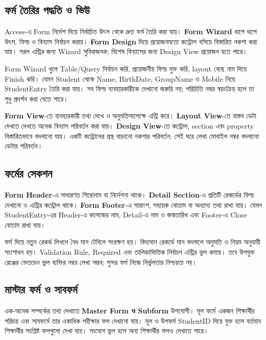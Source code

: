 \subsection{ফর্ম তৈরির পদ্ধতি ও ভিউ}
Access-এ Form নির্দেশ দিয়ে নির্বাচিত উৎস থেকে দ্রুত ফর্ম তৈরি করা যায়। \textbf{Form Wizard} ধাপে ধাপে উৎস, ফিল্ড ও বিন্যাস নির্বাচন করায়। \textbf{Form Design} দিয়ে প্রয়োজনমতো কন্ট্রোল বসিয়ে বিস্তারিত নকশা করা যায়। সরল এন্ট্রির জন্য Wizard সুবিধাজনক; বিশেষ বিন্যাসের জন্য Design View প্রয়োজন হতে পারে।

Form Wizard খুলে Table/Query নির্বাচন করি, প্রয়োজনীয় ফিল্ড যুক্ত করি, layout বেছে নাম দিয়ে Finish করি। যেমন Student থেকে Name, BirthDate, GroupName ও Mobile নিয়ে StudentEntry তৈরি করা যায়। সব ফিল্ড ব্যবহারকারীকে দেখানো জরুরি নয়; পরিচিতি নম্বর স্বয়ংক্রিয় হলে তা শুধু প্রদর্শন করা যেতে পারে।

\textbf{Form View}-তে ব্যবহারকারী তথ্য দেখে ও অনুমতিসাপেক্ষে এন্ট্রি করে। \textbf{Layout View}-তে বাস্তব ডেটা দেখতে দেখতে অনেক বিন্যাস পরিবর্তন করা যায়। \textbf{Design View}-তে কন্ট্রোল, section এবং property বিস্তারিতভাবে বদলানো যায়। একটি কন্ট্রোলের প্রস্থ বাড়ানো নকশার পরিবর্তন; সেই ঘরে লেখা মোবাইল নম্বর বদলানো ডেটার পরিবর্তন।

\subsection{ফর্মের সেকশন}
\textbf{Form Header}-এ সাধারণত শিরোনাম বা নির্দেশনা থাকে। \textbf{Detail Section}-এ প্রতিটি রেকর্ডের ফিল্ড দেখানো ও এন্ট্রির কন্ট্রোল থাকে। \textbf{Form Footer}-এ সারাংশ, সহায়ক বোতাম বা অন্যান্য তথ্য রাখা যায়। যেমন StudentEntry-এর Header-এ কলেজের নাম, Detail-এ নাম ও জন্মতারিখ এবং Footer-এ Close বোতাম রাখা যায়।

ফর্ম দিয়ে নতুন রেকর্ড লিখলে বৈধ মান টেবিলে সংরক্ষণ হয়। বিদ্যমান রেকর্ডে মান বদলালে অনুমতি ও নিয়ম অনুযায়ী সংশোধন হয়। Validation Rule, Required এবং তালিকাভিত্তিক নির্বাচন এন্ট্রির ভুল কমায়। তবে উপযুক্ত রেঞ্জের ভেতরেও ভুল ব্যক্তির নম্বর লেখা সম্ভব; সুন্দর ফর্ম নিজে নির্ভুলতার নিশ্চয়তা নয়।

\subsection{মাস্টার ফর্ম ও সাবফর্ম}
এক-অনেক সম্পর্কের তথ্য দেখাতে \textbf{Master Form ও Subform} উপযোগী। মূল ফর্মে একজন শিক্ষার্থীর পরিচয় এবং সাবফর্মে তার একাধিক পরীক্ষার ফল দেখানো যায়। মূল ও উপফর্ম StudentID দিয়ে যুক্ত হলে বর্তমান শিক্ষার্থীর সংশ্লিষ্ট ফলগুলো দেখা যায়। সংযোগ ভুল হলে অন্য শিক্ষার্থীর ফলও দেখাতে পারে।

